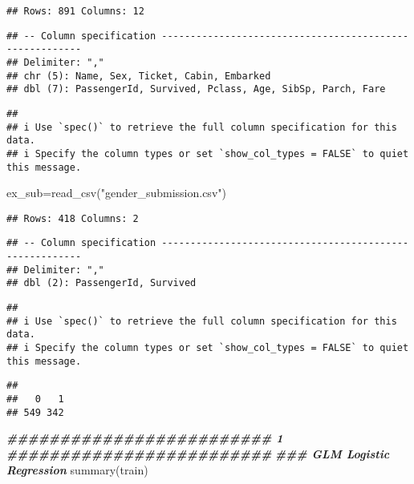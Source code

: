 \documentclass[
]{article}
\newenvironment{Shaded}{\begin{snugshade}}{\end{snugshade}}
\newcommand{\DocumentationTok}[1]{\textcolor[rgb]{0.56,0.35,0.01}{\textbf{\textit{#1}}}}
\newcommand{\FunctionTok}[1]{\textcolor[rgb]{0.00,0.00,0.00}{#1}}
\newcommand{\NormalTok}[1]{#1}
\newcommand{\OtherTok}[1]{\textcolor[rgb]{0.56,0.35,0.01}{#1}}
\newcommand{\SpecialCharTok}[1]{\textcolor[rgb]{0.00,0.00,0.00}{#1}}
\newcommand{\StringTok}[1]{\textcolor[rgb]{0.31,0.60,0.02}{#1}}
\begin{document}
\begin{verbatim}
## Rows: 891 Columns: 12
\end{verbatim}

\begin{verbatim}
## -- Column specification --------------------------------------------------------
## Delimiter: ","
## chr (5): Name, Sex, Ticket, Cabin, Embarked
## dbl (7): PassengerId, Survived, Pclass, Age, SibSp, Parch, Fare
\end{verbatim}

\begin{verbatim}
## 
## i Use `spec()` to retrieve the full column specification for this data.
## i Specify the column types or set `show_col_types = FALSE` to quiet this message.
\end{verbatim}

\begin{Shaded}
\begin{Highlighting}[]
\NormalTok{ex\_sub}\OtherTok{=}\FunctionTok{read\_csv}\NormalTok{(}\StringTok{"gender\_submission.csv"}\NormalTok{)}
\end{Highlighting}
\end{Shaded}

\begin{verbatim}
## Rows: 418 Columns: 2
\end{verbatim}

\begin{verbatim}
## -- Column specification --------------------------------------------------------
## Delimiter: ","
## dbl (2): PassengerId, Survived
\end{verbatim}

\begin{verbatim}
## 
## i Use `spec()` to retrieve the full column specification for this data.
## i Specify the column types or set `show_col_types = FALSE` to quiet this message.
\end{verbatim}

\begin{Shaded}
\end{Shaded}

\begin{verbatim}
## 
##   0   1 
## 549 342
\end{verbatim}

\begin{Shaded}
\begin{Highlighting}[]
\DocumentationTok{\#\#\#\#\#\#\#\#\#\#\#\#\#\#\#\#\#\#\#\#\#\#\#\#\# 1 \#\#\#\#\#\#\#\#\#\#\#\#\#\#\#\#\#\#\#\#\#\#\#\#\# }
\DocumentationTok{\#\#\# GLM Logistic Regression}
\FunctionTok{summary}\NormalTok{(train)}
\end{Highlighting}
\end{Shaded}
\end{document}
